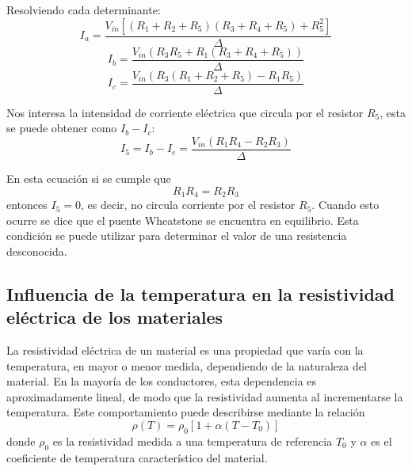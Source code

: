 \documentclass[12pt,a4paper]{article}
\begin{document}
Resolviendo cada determinante:
\begin{equation}
	I_a = \frac{V_{in}\left[(R_1 + R_2 + R_5)(R_3 + R_4 + R_5) + R_5^2\right]}{\Delta}
\end{equation}
\begin{equation}
	I_b = \frac{V_{in} (R_3 R_5 + R_1 (R_3 + R_4 + R_5))}{\Delta}
\end{equation}
\begin{equation}
	I_c = \frac{V_{in} (R_3 (R_1 + R_2 + R_5) - R_1 R_5)}{\Delta}
\end{equation}

Nos interesa la intensidad de corriente eléctrica que circula por el resistor $R_5$, esta se puede obtener como $I_b - I_c$:
\begin{equation}
	I_5 = I_b - I_c = \frac{V_{in} (R_1 R_4 - R_2 R_3)}{\Delta}
\end{equation}

En esta ecuación si se cumple que 
\begin{equation}
	R_1 R_4 = R_2 R_3
	\label{eq:wheatstoneequilibrio}
\end{equation}
entonces $I_5 = 0$, es decir, no circula corriente por el resistor $R_5$. Cuando esto ocurre se dice que el puente Wheatstone se encuentra en equilibrio.  Esta condición se puede utilizar para determinar el valor de una resistencia desconocida.

\bigskip
\subsection{Influencia de la temperatura en la resistividad eléctrica de los materiales}
La resistividad eléctrica de un material es una propiedad que varía con la temperatura, en mayor o menor medida, dependiendo de la naturaleza del material. En la mayoría de los conductores, esta dependencia es aproximadamente lineal, de modo que la resistividad aumenta al incrementarse la temperatura. Este comportamiento puede describirse mediante la relación
\begin{equation}
	\rho(T) = \rho_0 [1 + \alpha (T - T_0)]
\end{equation}
donde $\rho_0$ es la resistividad medida a una temperatura de referencia $T_0$ y $\alpha$ es el coeficiente de temperatura característico del material.
\end{document}
